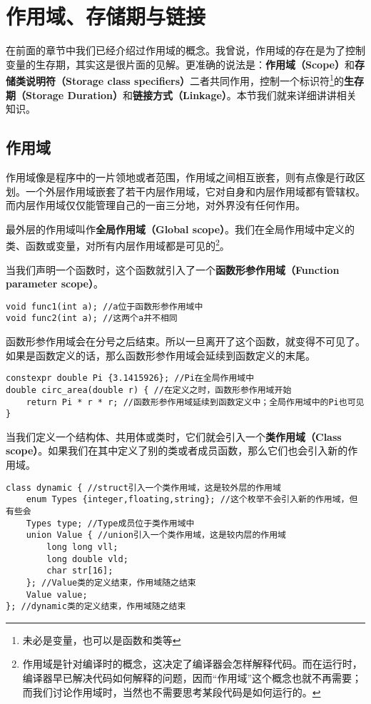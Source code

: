 \section{作用域、存储期与链接}
在前面的章节中我们已经介绍过作用域的概念。我曾说，作用域的存在是为了控制变量的生存期，其实这是很片面的见解。更准确的说法是：\textbf{作用域（Scope）}和\textbf{存储类说明符（Storage class specifiers）}二者共同作用，控制一个标识符\footnote{未必是变量，也可以是函数和类等}的\textbf{生存期（Storage Duration）}和\textbf{链接方式（Linkage）}。本节我们就来详细讲讲相关知识。\par
\subsection*{作用域}
作用域像是程序中的一片领地或者范围，作用域之间相互嵌套，则有点像是行政区划。一个外层作用域嵌套了若干内层作用域，它对自身和内层作用域都有管辖权。而内层作用域仅仅能管理自己的一亩三分地，对外界没有任何作用。\par
最外层的作用域叫作\textbf{全局作用域（Global scope）}。我们在全局作用域中定义的类、函数或变量，对所有内层作用域都是可见的\footnote{作用域是针对编译时的概念，这决定了编译器会怎样解释代码。而在运行时，编译器早已解决代码如何解释的问题，因而``作用域''这个概念也就不再需要；而我们讨论作用域时，当然也不需要思考某段代码是如何运行的。}。\par
当我们声明一个函数时，这个函数就引入了一个\textbf{函数形参作用域（Function parameter scope）}。
\begin{lstlisting}
void func1(int a); //a位于函数形参作用域中
void func2(int a); //这两个a并不相同
\end{lstlisting}
函数形参作用域会在分号之后结束。所以一旦离开了这个函数，\lstinline@a@ 就变得不可见了。如果是函数定义的话，那么函数形参作用域会延续到函数定义的末尾。
\begin{lstlisting}
constexpr double Pi {3.1415926}; //Pi在全局作用域中
double circ_area(double r) { //在定义之时，函数形参作用域开始
    return Pi * r * r; //函数形参作用域延续到函数定义中；全局作用域中的Pi也可见
}
\end{lstlisting}\par
当我们定义一个结构体、共用体或类时，它们就会引入一个\textbf{类作用域（Class scope）}。如果我们在其中定义了别的类或者成员函数，那么它们也会引入新的作用域。\par
\begin{lstlisting}
class dynamic { //struct引入一个类作用域，这是较外层的作用域
    enum Types {integer,floating,string}; //这个枚举不会引入新的作用域，但有些会
    Types type; //Type成员位于类作用域中
    union Value { //union引入一个类作用域，这是较内层的作用域
        long long vll;
        long double vld;
        char str[16];
    }; //Value类的定义结束，作用域随之结束
    Value value;
}; //dynamic类的定义结束，作用域随之结束
\end{lstlisting}
